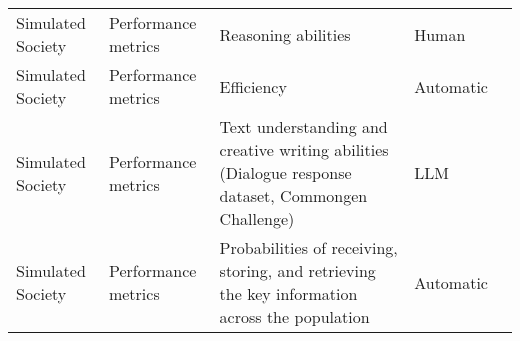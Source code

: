 \begin{small}
\begin{center}
\begin{longtable}{@{}p{}p{}p{}p{}p{}@{}}
Simulated Society        & Performance metrics                 & Reasoning abilities                                                                                                                                                                                         & Human     & \cite{chen2023agentversefacilitatingmultiagentcollaboration}                                                                                                                                                                                                                                                                                                                                                                                                 \\
Simulated Society        & Performance metrics                 & Efficiency                                                                                                                                                                                                  & Automatic & \cite{piatti2024cooperatecollapseemergencesustainable}                                                                                                                                                                                                                                                                                                                                                                                                  \\
Simulated Society        & Performance metrics                 & Text understanding and creative writing abilities (Dialogue response dataset, Commongen Challenge)                                                                                                          & LLM       & \cite{chen2023agentversefacilitatingmultiagentcollaboration}                                                                                                                                                                                                                                                                                                                                                                                                 \\
Simulated Society        & Performance metrics                 & Probabilities of receiving, storing, and retrieving the key information across the population                                                                                                               & Automatic & \cite{kaiya2023lyfeagentsgenerativeagents}                                                                                                                                                                                                                                                                                                                                                                                              \\

\end{longtable}
\end{center}
\end{small}

